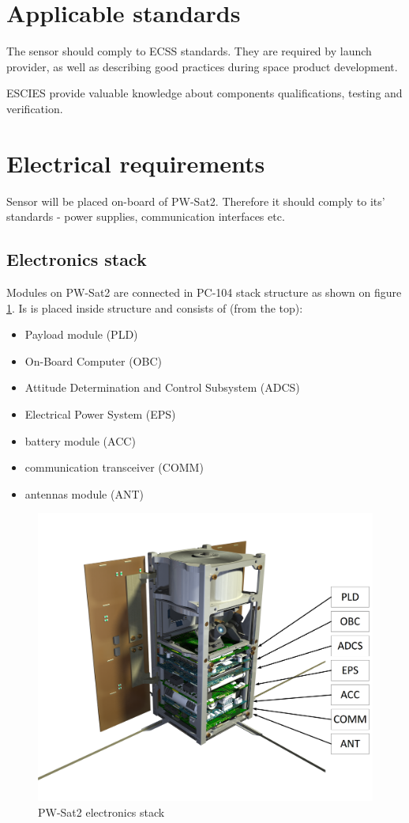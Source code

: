 \section{Applicable standards}
	The sensor should comply to ECSS \cite{ECSS_URL} standards. They are required by launch provider, as well as describing good practices during space product development.
	
	ESCIES \cite{ESCIES_URL} provide valuable knowledge about components qualifications, testing and verification.



\section{Electrical requirements}
	Sensor will be placed on-board of PW-Sat2. Therefore it should comply to its' standards - power supplies, communication interfaces etc.
	
\subsection{Electronics stack}
	Modules on PW-Sat2 are connected in PC-104 stack structure as shown on figure \ref{PW-Sat2_stack}. Is is placed inside structure and consists of (from the top):
	\begin{itemize}
		\item Payload module (PLD)
		\item On-Board Computer (OBC)
		\item Attitude Determination and Control Subsystem (ADCS)
		\item Electrical Power System (EPS)
		\item battery module (ACC)
		\item communication transceiver (COMM)
		\item antennas module (ANT)
	\end{itemize}

	\begin{figure}[H]
		\centering
		\includegraphics[width=0.7\paperwidth]{img/PW-Sat2-stack.png}
		\caption{PW-Sat2 electronics stack}
		\label{PW-Sat2_stack}
	\end{figure}



